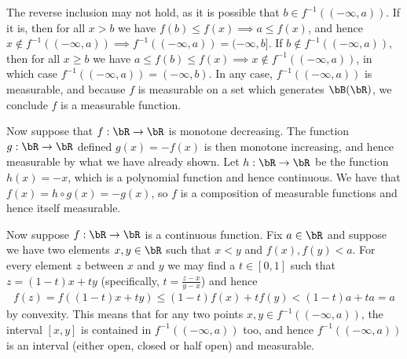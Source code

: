 \begin{homework}[e]
\begin{prf}
		The reverse inclusion may not hold, as it is possible that $b \in f^{-1}((-\infty,a))$. If it is, then for all $x > b$ we have $f(b) \leq f(x)\implies a \leq f(x)$, and hence $x \not \in f^{-1}((-\infty,a)) \implies f^{-1}((-\infty,a)) = (-\infty,b]$. If $b \not\in f^{-1}((-\infty,a))$, then for all $x \geq b$ we have $a \leq f(b) \leq f(x)\implies x \not\in f^{-1}((-\infty,a))$, in which case $f^{-1}((-\infty,a)) = (-\infty,b)$. In any case, $f^{-1}((-\infty,a))$ is measurable, and because $f$ is measurable on a set which generates $\bB(\bR)$, we conclude $f$ is a measurable function.

		Now suppose that $f:\bR\to \bR$ is monotone decreasing. The function $g:\bR\to \bR$ defined $g(x) = - f(x)$ is then monotone increasing, and hence measurable by what we have already shown. Let $h:\bR\to \bR$ be the function $h(x) = -x$, which is a polynomial function and hence continuous. We have that $f(x) = h\circ g (x) = -g(x)$, so $f$ is a composition of measurable functions and hence itself measurable.

		Now suppose $f:\bR\to \bR$ is a continuous function. Fix $a \in \bR$ and suppose we have two elements $x, y\in \bR$ such that $x < y$ and $f(x), f(y) < a$. For every element $z$ between $x$ and $y$ we may find a $t \in [0,1]$ such that $z = (1-t)x + ty$ \big(specifically, $t = \frac{z - x}{y - x}$\big) and hence
		\begin{align*}
			f(z) = f((1-t)x + ty) \leq (1-t)f(x)+tf(y) < (1-t)a + ta = a
		\end{align*}
		by convexity. This means that for any two points $x,y \in f^{-1}((-\infty,a))$, the interval $[x,y]$ is contained in $f^{-1}((-\infty,a))$ too, and hence $f^{-1}((-\infty,a))$ is an interval (either open, closed or half open) and measurable.


\end{prf}
\end{homework}
